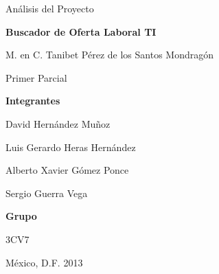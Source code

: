 \vspace{3cm}
\centerline{\huge Análisis del Proyecto }
\vspace{0.3cm}
\centerline{\huge \bf Buscador de Oferta Laboral TI}

\vspace{2cm}

\centerline{\Large  M. en C. Tanibet Pérez de los Santos Mondragón }
\vspace{2cm}
\centerline{\Large  Primer Parcial }

\vspace{2cm}

\centerline{\Large \bf Integrantes }
\vspace{0.6cm}
\centerline{\Large  David Hernández Muñoz}
\vspace{0.6cm}
\centerline{\Large  Luis Gerardo Heras Hernández}
\vspace{0.6cm}
\centerline{\Large  Alberto Xavier Gómez Ponce}
\vspace{0.6cm}
\centerline{\Large  Sergio Guerra Vega}

\vspace{0.8cm}

\centerline{\Large \bf Grupo }
\vspace{0.6cm}
\centerline{\Large  3CV7 }

\vspace{2cm}
{\large  M\'{e}xico, D.F. \hfill 2013}